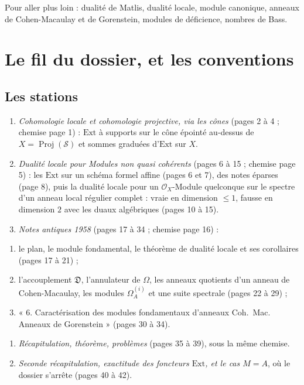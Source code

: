 \documentclass[11pt,a4paper]{article}
\begin{document}
\begin{resume}
Pour aller plus loin : dualité de Matlis, dualité locale, module canonique,
anneaux de Cohen-Macaulay et de Gorenstein, modules de déficience, nombres de
Bass.

\end{resume}

\section*{Le fil du dossier, et les conventions}

\subsection*{Les stations}

\begin{enumerate}
\item[I.] \emph{Cohomologie locale et cohomologie projective, via les cônes}
(pages 2 à 4 ; chemise page 1) : $\mathrm{Ext}$ à supports sur le cône épointé
au-dessus de $X = \operatorname{Proj}(\mathcal{S})$ et sommes graduées
d'$\mathrm{Ext}$ sur $X$.
\item[II.] \emph{Dualité locale pour Modules non quasi cohérents} (pages 6 à
15 ; chemise page 5) : les $\mathrm{Ext}$ sur un schéma formel affine (pages
6 et 7), des notes éparses (page 8), puis la dualité locale pour un
$\mathcal{O}_X$-Module quelconque sur le spectre d'un anneau local régulier
complet : vraie en dimension $\leqslant 1$, fausse en dimension $2$ avec les
duaux algébriques (pages 10 à 15).
\item[III.] \emph{Notes antiques 1958} (pages 17 à 34 ; chemise page 16) :
\end{enumerate}
\begin{enumerate}
\item[III.1.] le plan, le module fondamental, le théorème de dualité locale et
ses corollaires (pages 17 à 21) ;
\item[III.2.] l'accouplement $\mathfrak{D}$, l'annulateur de $\Omega$, les
anneaux quotients d'un anneau de Cohen-Macaulay, les modules $\Omega_A^{(i)}$
et une suite spectrale (pages 22 à 29) ;
\item[III.3.] « 6. Caractérisation des modules fondamentaux d'anneaux Coh.\
Mac. Anneaux de Gorenstein » (pages 30 à 34).
\end{enumerate}
\begin{enumerate}
\item[IV.] \emph{Récapitulation, théorème, problèmes} (pages 35 à 39), sous
la même chemise.
\item[V.] \emph{Seconde récapitulation, exactitude des foncteurs
$\mathrm{Ext}$, et le cas $M = A$}, où le dossier s'arrête (pages 40 à 42).
\end{enumerate}
\end{document}
